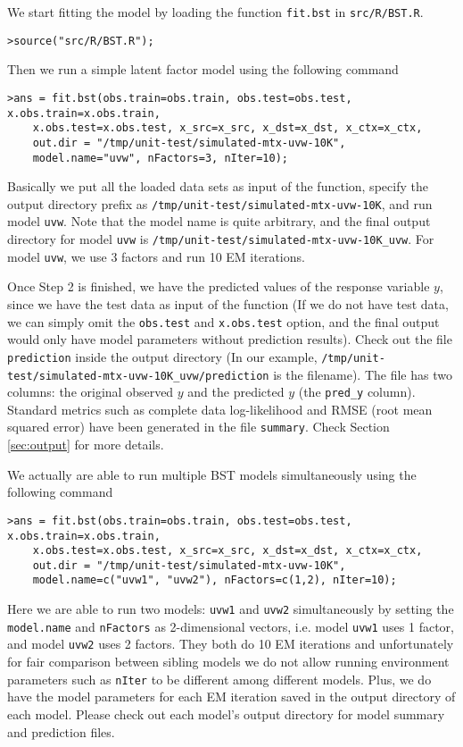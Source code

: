 We start fitting the model by loading the function {\tt fit.bst} in {\tt src/R/BST.R}. 
{\small\begin{verbatim}
>source("src/R/BST.R");
\end{verbatim}}
Then we run a simple latent factor model using the following command
{\small\begin{verbatim}
>ans = fit.bst(obs.train=obs.train, obs.test=obs.test, x.obs.train=x.obs.train, 
	x.obs.test=x.obs.test, x_src=x_src, x_dst=x_dst, x_ctx=x_ctx,
	out.dir = "/tmp/unit-test/simulated-mtx-uvw-10K", 
	model.name="uvw", nFactors=3, nIter=10);
\end{verbatim}}
Basically we put all the loaded data sets as input of the function, specify the output directory prefix as {\tt /tmp/unit-test/simulated-mtx-uvw-10K}, and run model {\tt uvw}. Note that the model name is quite arbitrary, and the final output directory for model {\tt uvw} is {\tt /tmp/unit-test/simulated-mtx-uvw-10K\_uvw}. For model {\tt uvw}, we use 3 factors and run 10 EM iterations. 

Once Step 2 is finished, we have the predicted values of the response variable $y$, since we have the test data as input of the function (If we do not have test data, we can simply omit the {\tt obs.test} and {\tt x.obs.test} option, and the final output would only have model parameters without prediction results).  Check out the file {\tt prediction} inside the output directory (In our example, {\tt /tmp/unit-test/simulated-mtx-uvw-10K\_uvw/prediction} is the filename). The file has two columns: the original observed $y$ and the predicted $y$ (the {\tt pred\_y} column). Standard metrics such as complete data log-likelihood and RMSE (root mean squared error) have been generated in the file {\tt summary}. Check Section \ref{sec:output} for more details.

We actually are able to run multiple BST models simultaneously using the following command
{\small\begin{verbatim}
>ans = fit.bst(obs.train=obs.train, obs.test=obs.test, x.obs.train=x.obs.train, 
	x.obs.test=x.obs.test, x_src=x_src, x_dst=x_dst, x_ctx=x_ctx,
	out.dir = "/tmp/unit-test/simulated-mtx-uvw-10K", 
	model.name=c("uvw1", "uvw2"), nFactors=c(1,2), nIter=10);
\end{verbatim}}
Here we are able to run two models: {\tt uvw1} and {\tt uvw2} simultaneously by setting the {\tt model.name} and {\tt nFactors} as  2-dimensional vectors, i.e. model {\tt uvw1} uses 1 factor, and model {\tt uvw2} uses 2 factors. They both do 10 EM iterations and unfortunately for fair comparison between sibling models we do not allow running environment parameters such as {\tt nIter} to be different among different models. Plus, we do have the model parameters for each EM iteration saved in the output directory of each model. Please check out each model's output directory for model summary and prediction files.

